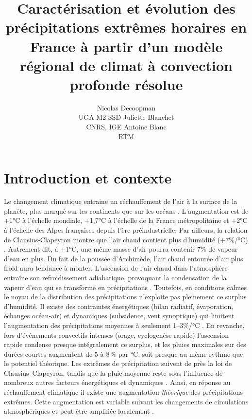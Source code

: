 \documentclass[
  article,
  nofooter,
  noheadings]{jss}
\author{Nicolas Decoopman\\UGA M2 SSD \And Juliette Blanchet\\CNRS,
IGE \And Antoine Blanc\\RTM}
\title{Caractérisation et évolution des précipitations extrêmes horaires
en France à partir d'un modèle régional de climat à convection profonde
résolue}
\begin{document}
\maketitle


\newpage

\section{Introduction et contexte}\label{introduction-et-contexte}

Le changement climatique entraine un réchauffement de l'air à la surface
de la planète, plus marqué sur les continents que sur les océans
\citep{IPCC2021}. L'augmentation est de +1°C à l'échelle mondiale,
+1,7°C à l'échelle de la France métropolitaine et +2°C à l'échelle des
Alpes françaises depuis l'ère préindustrielle. Par ailleurs, la relation
de Clausius-Clapeyron montre que l'air chaud contient plus d'humidité
(+7\%/°C) \citep{clapeyron1834}. Autrement dit, à +1°C, une même masse
d'air pourra contenir 7\% de vapeur d'eau en plus. Du fait de la poussée
d'Archimède, l'air chaud entourée d'air plus froid aura tendance à
monter. L'ascension de l'air chaud dans l'atmosphère entraîne son
refroidissement adiabatique, provoquant la condensation de la vapeur
d'eau qui se transforme en précipitations \citep{meteofrance}.
Toutefois, en conditions calmes le noyau de la distribution des
précipitations n'exploite pas pleinement ce surplus d'humidité. Il
existe des contraintes énergétiques (bilan radiatif, évaporation,
échanges océan‑air) et dynamiques (subsidence, vent synoptique) qui
limitent l'augmentation des précipitations moyennes à seulement
1--3\%/°C \citep{IPCC2021}. En revanche, lors d'événements convectifs
intenses (orage, cyclogenèse rapide) l'ascension rapide condense presque
intégralement ce surplus, et les pluies maximales sur des durées courtes
augmentent de 5 à 8\,\% par °C, soit presque au même rythme que le
potentiel théorique. Les extrêmes de précipitation suivent de près la
loi de Clausius--Clapeyron, tandis que la pluie moyenne reste sous
l'influence de nombreux autres facteurs énergétiques et dynamiques
\citep{ogorman2015contrasting}. Ainsi, en réponse au réchauffement
climatique il existe une augmentation \emph{théorique} des
précipitations extrêmes. Cette augmentation est variable suivant les
changements de circulations atmosphériques et peut être amplifiée
localement \citep{blanchet2021explaining}.
\end{document}
